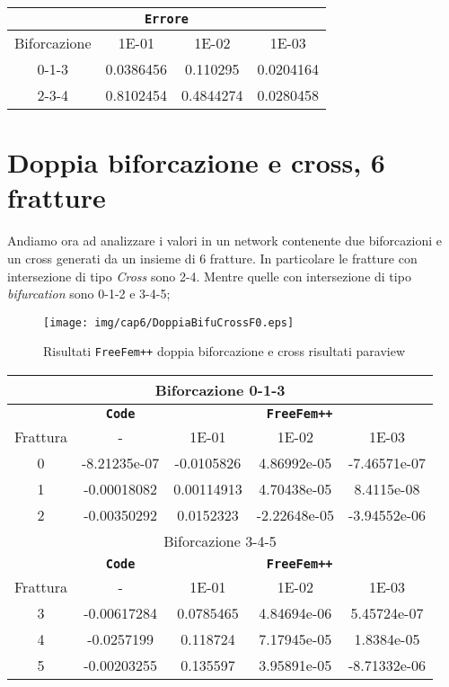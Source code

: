 \begin{center}
\begin{tabular}{|c|c|c|c|}
\hline
  \multicolumn{4}{|c|}{\textbf{\texttt{Errore}}} \\ 
\hline
\multicolumn{1}{|c|}{Biforcazione} &
\multicolumn{1}{|c|}{1E-01} & 1E-02 & 1E-03 \\
\hline
  0-1-3 &  0.0386456 & 0.110295 & 0.0204164 \\
  2-3-4 & 0.8102454 & 0.4844274 & 0.0280458 \\
\hline
\end{tabular}
\end{center}


\section{Doppia biforcazione e cross, 6 fratture}
Andiamo ora ad analizzare i valori in un network contenente due biforcazioni e un cross generati da un insieme di 6 fratture. In particolare le fratture con intersezione di tipo \textit{Cross} sono 2-4. Mentre quelle con intersezione di tipo \textit{bifurcation} sono 0-1-2 e 3-4-5;\\

\begin{figure}[h!]
\centering
\texttt{[image: img/cap6/DoppiaBifuCrossF0.eps]}
\caption{Risultati \texttt{FreeFem++} doppia biforcazione e cross risultati paraview }\label{DoppiaBifuCrossParaview}
\end{figure}

\begin{center}
\begin{tabular}{|c|c|c|c|c|}
\hline
\multicolumn{5}{|c|}{Biforcazione 0-1-3}\\
\hline
 & \textbf{\texttt{Code}} & \multicolumn{3}{|c|}{\textbf{\texttt{FreeFem++}}} \\
\hline
\multicolumn{1}{|c|}{Frattura} & - &
\multicolumn{1}{|c|}{1E-01} & 1E-02 & 1E-03 \\
\hline
 0 & -8.21235e-07 & -0.0105826 & 4.86992e-05 & -7.46571e-07\\
 1 & -0.00018082 & 0.00114913 & 4.70438e-05 & 8.4115e-08\\  
 2 & -0.00350292 & 0.0152323 & -2.22648e-05 & -3.94552e-06\\
\hline
\multicolumn{5}{|c|}{Biforcazione 3-4-5}\\
\hline
 & \textbf{\texttt{Code}} & \multicolumn{3}{|c|}{\textbf{\texttt{FreeFem++}}} \\
\hline
\multicolumn{1}{|c|}{Frattura} & - &
\multicolumn{1}{|c|}{1E-01} & 1E-02 & 1E-03 \\
\hline
 3 & -0.00617284 & 0.0785465 & 4.84694e-06 & 5.45724e-07\\ 
 4 & -0.0257199 & 0.118724 & 7.17945e-05 & 1.8384e-05\\
 5 & -0.00203255 & 0.135597 & 3.95891e-05 & -8.71332e-06\\
\hline
\end{tabular}
\end{center}

